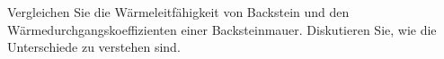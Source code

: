 Vergleichen Sie die Wärmeleitfähigkeit von Backstein und den Wärmedurchgangskoeffizienten einer Backsteinmauer. Diskutieren Sie, wie die Unterschiede zu verstehen sind.
